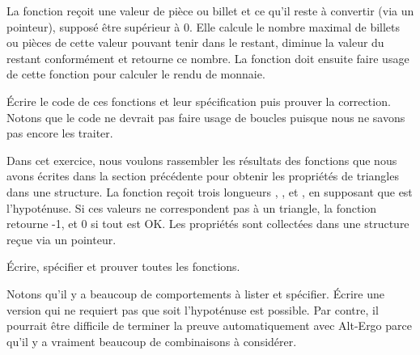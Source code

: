 

La fonction  reçoit une valeur de pièce ou
billet et ce qu'il reste à convertir (via un pointeur), supposé être
supérieur à 0. Elle calcule le nombre maximal de billets ou pièces de cette
valeur pouvant tenir dans le restant, diminue la valeur du restant
conformément et retourne ce nombre. La fonction 
doit ensuite faire usage de cette fonction pour calculer le rendu de
monnaie.


Écrire le code de ces fonctions et leur spécification puis prouver la
correction. Notons que le code ne devrait pas faire usage de boucles
puisque nous ne savons pas encore les traiter.




Dans cet exercice, nous voulons rassembler les résultats des fonctions
que nous avons écrites dans la section précédente pour obtenir les
propriétés de triangles dans une structure. La fonction
 reçoit trois longueurs ,
, et , en supposant que  est
l'hypoténuse. Si ces valeurs ne correspondent pas à un triangle, la
fonction retourne -1, et 0 si tout est OK. Les propriétés sont
collectées dans une structure  reçue via un pointeur.




Écrire, spécifier et prouver toutes les fonctions.

Notons qu'il y a beaucoup de comportements à lister et spécifier.
Écrire une version qui ne requiert pas que  soit
l'hypoténuse est possible. Par contre, il pourrait être difficile
de terminer la preuve automatiquement avec Alt-Ergo parce qu'il y a
vraiment beaucoup de combinaisons à considérer.
